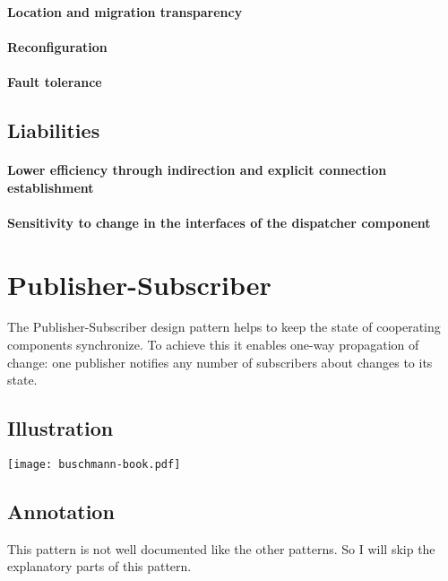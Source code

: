 \documentclass[a4paper,11pt,twocolumn]{report}
\begin{document}
    \paragraph{Location and migration transparency}
    \paragraph{Reconfiguration}
    \paragraph{Fault tolerance}
    \subsection{Liabilities}
    \paragraph{Lower efficiency through indirection and explicit connection
        establishment}
    \paragraph{Sensitivity to change in the interfaces of the dispatcher
        component}



    \section{Publisher-Subscriber}
    The Publisher-Subscriber design pattern helps to keep the state of
    cooperating components synchronize. To achieve this it enables one-way
    propagation of change: one publisher notifies any number of subscribers
    about changes to its state.
    \subsection{Illustration}
    \texttt{[image: buschmann-book.pdf]}
    \subsection{Annotation}
    This pattern is not well documented like the other patterns. So I will skip
    the explanatory parts of this pattern.
\end{document}
